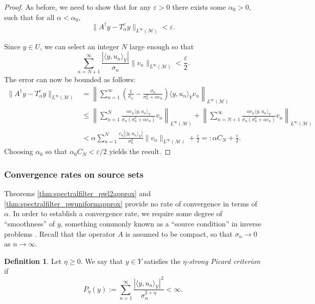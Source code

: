 \documentclass{article}
\theoremstyle{definition}
\newtheorem{definition}[theorem]{Definition}
\newcommand{\smallnorm}[1]{\lVert#1\rVert}
\newcommand{\norm}[1]{\left\lVert#1\right\rVert}
\newcommand{\abs}[1]{\left\lvert#1\right\rvert}
\newcommand{\pseudoinv}[1]{{#1}^\dagger}
\begin{document}
\begin{proof}
As before, we need to show that for any  \(\varepsilon>0\) there  exists some \(\alpha_0>0\), such that for all $\alpha < \alpha_0,$
 $$
 \smallnorm{\pseudoinv{A} y - T^c_\alpha y}_{L^\infty(\mathcal{M})} < \varepsilon.
 $$

Since \(y\in U\),
we can select an integer \(N\) large enough so that
\begin{equation*}
    \sum_{n=N+1}^\infty \frac{\abs{\langle y,u_n\rangle_Y}}{\sigma_n}\smallnorm{v_n}_{L^\infty(\mathcal{M})} < 
    \frac{\varepsilon}{2}.
\end{equation*}
The error can now be bounded as follows:
\begin{align*}
    \smallnorm{\pseudoinv{A} y - T^c_\alpha y}_{L^\infty(\mathcal{M})}
    & =
    \norm{
    \sum_{n=1}^\infty \left( \frac{1}{\sigma_n} - \frac{\sigma_n}{\sigma_n^2+\alpha c_n} \right) \langle y, u_n\rangle_Y v_n
    }_{L^\infty(\mathcal{M})}
    \\&\leq
    \norm{
    \sum_{n=1}^N 
    \frac{\alpha c_n
    \langle y, u_n\rangle_Y}{\sigma_n\left(\sigma_n^2+\alpha c_n\right)} v_n
    }_{L^\infty(\mathcal{M})}+\norm{
    \sum_{n=N+1}^\infty 
    \frac{\alpha c_n
    \langle y, u_n\rangle_Y}{\sigma_n\left(\sigma_n^2+\alpha c_n\right)} v_n
    }_{L^\infty(\mathcal{M})}
    \\&<
    \alpha
    \sum_{n=1}^N 
    \frac{c_n
    \abs{\langle y, u_n\rangle_Y}}{\sigma_n^3}
    \smallnorm{v_n
    }_{L^\infty(\mathcal{M})}
    +
    \frac{\varepsilon}{2}
    =:
    \alpha C_N + \frac{\varepsilon}{2}.
\end{align*}
Choosing \(\alpha_0\) so that \(\alpha_0 C_N < \varepsilon/2\) yields the result.
\end{proof}


\subsubsection{Convergence rates on source sets}
Theorems \ref{thm:spectralfilter_pwl2approx} and \ref{thm:spectralfilter_pwuniformapprox} provide no rate of convergence in terms of \(\alpha\).
In order to establish a convergence rate,
we require some degree of ``smoothness'' of \(y\), something commonly known as a ``source condition'' in inverse problems \cite{engl2000regularization}.
Recall that the operator \(A\) is assumed to be compact, so that \(\sigma_n \to 0\) as $n \to \infty$.

\begin{definition}
\label{def:strongpicard}
    Let \(\eta\geq 0\). 
    We say that \(y\in Y\) satisfies the \emph{\(\eta\)-strong Picard criterion}
    if
    \begin{equation}
    \label{eq:picardstrong}
        P_\eta(y) := \sum_{n=1}^\infty
        \frac{\abs{\langle y, u_n \rangle_Y}^2}{
        \sigma_n^{2+\eta}
        }
        <
        \infty
    .\end{equation}
\end{definition}
\end{document}
